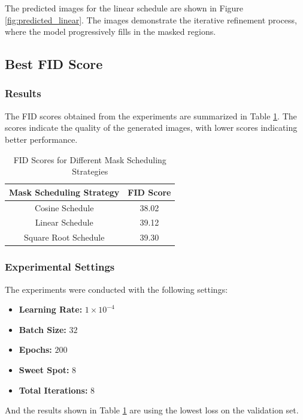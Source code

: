 The predicted images for the linear schedule are shown in Figure \ref{fig:predicted_linear}. The images demonstrate the iterative refinement process, where the model progressively fills in the masked regions.

\subsection{Best FID Score}

\subsubsection{Results}

The FID scores obtained from the experiments are summarized in Table \ref{tab:fid_scores}.
The scores indicate the quality of the generated images, with lower scores indicating better performance.

\begin{table}[H]
    \centering
    \caption{FID Scores for Different Mask Scheduling Strategies}
    \label{tab:fid_scores}
    \begin{tabular}{c||c}
        \textbf{Mask Scheduling Strategy} & \textbf{FID Score} \\ \hline\hline
        Cosine Schedule                   & 38.02              \\ \hline
        Linear Schedule                   & 39.12              \\ \hline
        Square Root Schedule              & 39.30              \\ \hline
    \end{tabular}
\end{table}

\subsubsection{Experimental Settings}

The experiments were conducted with the following settings:

\begin{itemize}
    \item \textbf{Learning Rate:} $1\times10^{-4}$
    \item \textbf{Batch Size:} $32$
    \item \textbf{Epochs:} $200$
    \item \textbf{Sweet Spot:} $8$
    \item \textbf{Total Iterations:} $8$
\end{itemize}


And the results shown in Table \ref{tab:fid_scores} are using the lowest loss on the validation set.
